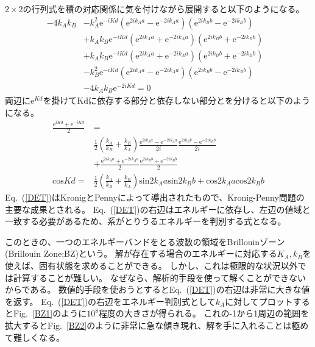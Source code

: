 \documentclass[autodetect-engine,dvipdfmx-if-dvi,ja=standard,a4paper,layout=v2]{bxjsreport}
\newcommand{\eref}[1]{Eq.~(\ref{#1})}
\newcommand{\fref}[1]{Fig.~\ref{#1}}
\begin{document}
    $2\times2$の行列式を積の対応関係に気を付けながら展開すると以下のようになる。
    \begin{align}
    -4k_Ak_B&-k_A^2\mathrm{e}^{-iKd}(\mathrm{e}^{2ik_Aa}-\mathrm{e}^{-2ik_Aa})(\mathrm{e}^{2ik_Bb}-\mathrm{e}^{-2ik_Bb})&\nonumber\\
    &+k_Ak_B\mathrm{e}^{-iKd}(\mathrm{e}^{2ik_Aa}+\mathrm{e}^{-2ik_Aa})(\mathrm{e}^{2ik_Bb}+\mathrm{e}^{-2ik_Bb})&\nonumber\\
    &+k_Ak_B\mathrm{e}^{-iKd}(\mathrm{e}^{2ik_Aa}+\mathrm{e}^{-2ik_Aa})(\mathrm{e}^{2ik_Bb}+\mathrm{e}^{-2ik_Bb})&\nonumber\\
    &-k_B^2\mathrm{e}^{-iKd}(\mathrm{e}^{2ik_Aa}-\mathrm{e}^{-2ik_Aa})(\mathrm{e}^{2ik_Bb}-\mathrm{e}^{-2ik_Bb})&\nonumber\\
    &-4k_Ak_B\mathrm{e}^{-2iKd}=0&
    \end{align}
    両辺に$\mathrm{e}^{Kd}$を掛けてKdに依存する部分と依存しない部分とを分けると以下のようになる。
    \begin{align}
    \frac{\mathrm{e}^{iKd}+\mathrm{e}^{-iKd}}{2}&=\nonumber\\
    &\frac{1}{2}\left(\frac{k_A}{k_B}+\frac{k_B}{k_A}\right)\frac{\mathrm{e}^{2ik_Aa}-\mathrm{e}^{-2ik_Aa}}{2i}\frac{\mathrm{e}^{2ik_Bb}-\mathrm{e}^{-2ik_Bb}}{2i}\nonumber\\
    &+\frac{\mathrm{e}^{2ik_Aa}+\mathrm{e}^{-2ik_Aa}}{2}\frac{\mathrm{e}^{2ik_Bb}+\mathrm{e}^{-2ik_Bb}}{2}\nonumber\\
    \mathrm{cos} Kd=&\frac{1}{2}\left(\frac{k_A}{k_B}+\frac{k_B}{k_A}\right)\mathrm{sin} 2k_Aa\mathrm{sin} 2k_Bb+\mathrm{cos} 2k_Aa\mathrm{cos} 2k_Bb\label{DET} 
    \end{align}
    \eref{DET}はKronigとPennyによって導出されたもので、Kronig-Penny問題の主要な成果とされる。
    \eref{DET}の右辺はエネルギーに依存し、左辺の値域と一致する必要があるため、系がとりうるエネルギーを判別する式となる。\par
    このときの、一つのエネルギーバンドをとる波数の領域をBrillouinゾーン(Brillouin Zone;BZ)という。
    解が存在する場合のエネルギーに対応する$K_A,k_B$を使えば、固有状態を求めることができる。
    \newpage
    しかし、これは極限的な状況以外では計算することが難しい。
    なぜなら、解析的手段を使って解くことができないからである。
    数値的手段を使おうとすると\eref{DET}の右辺は非常に大きな値を返す。
    \eref{DET}の右辺をエネルギー判別式として$k_A$に対してプロットすると\fref{BZ1}のように$10^8$程度の大きさが得られる。
    これの-1から1周辺の範囲を拡大すると\fref{BZ2}のように非常に急な傾き現れ、解を手に入れることは極めて難しくなる。
\end{document}
